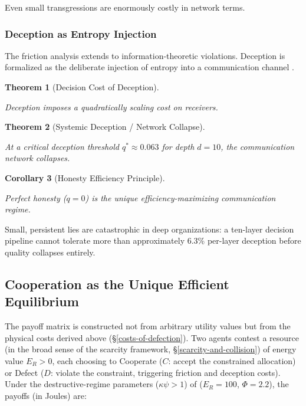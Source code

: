 \documentclass[11pt]{article}
\theoremstyle{plain}
\newtheorem{theorem}{Theorem}
\newtheorem{corollary}[theorem]{Corollary}
\theoremstyle{definition}
\theoremstyle{remark}
\let\origsubsection\subsection
\renewcommand{\subsection}{\needspace{7\baselineskip}\origsubsection}
\let\origsubsubsection\subsubsection
\renewcommand{\subsubsection}{\needspace{4\baselineskip}\origsubsubsection}
\begin{document}
Even small transgressions are enormously costly in network terms.

\subsubsection{Deception as Entropy
Injection}\label{deception-as-entropy-injection}

The friction analysis extends to information-theoretic violations.
Deception is formalized as the deliberate injection of entropy into a
communication channel \citep{TC-II}.

\begin{theorem}[Decision Cost of Deception]
\label{ethics-thm-deception-cost}

Deception imposes a quadratically scaling cost on receivers. \citep{TC-II}
\end{theorem}

\begin{theorem}[Systemic Deception / Network Collapse]
\label{ethics-thm-systemic-deception}

At a critical deception threshold $q^* \approx 0.063$ for depth $d = 10$, the communication network collapses. \citep{TC-II}
\end{theorem}

\begin{corollary}[Honesty Efficiency Principle]
\label{ethics-cor-honesty}

Perfect honesty ($q = 0$) is the unique efficiency-maximizing communication regime. \citep{TC-II}
\end{corollary}

Small, persistent lies are catastrophic in deep organizations: a
ten-layer decision pipeline cannot tolerate more than approximately
6.3\% per-layer deception before quality collapses entirely.

\subsection{Cooperation as the Unique Efficient
Equilibrium}\label{cooperation-as-the-unique-efficient-equilibrium}

The payoff matrix is constructed not from arbitrary utility values but
from the physical costs derived above (§\ref{costs-of-defection}). Two
agents contest a resource (in the broad sense of the scarcity framework,
§\ref{scarcity-and-collision}) of energy value \(E_R > 0\), each
choosing to Cooperate (\(C\): accept the constrained allocation) or
Defect (\(D\): violate the constraint, triggering friction and deception
costs). Under the destructive-regime parameters (\(\kappa\psi > 1\)) of
\citep{TC-V} (\(E_R = 100\), \(\Phi = 2.2\)), the payoffs (in Joules)
are:
\end{document}
